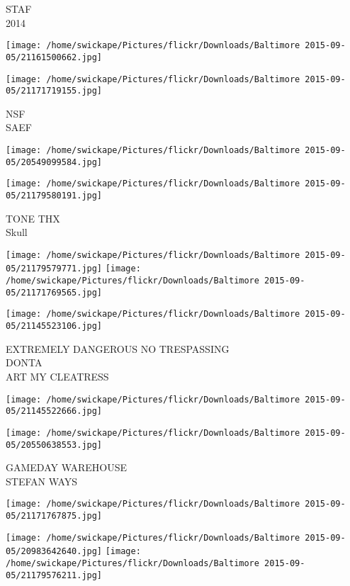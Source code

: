 \documentclass[10pt,letterpaper]{article}
\begin{document}
STAF\\
2014
\pagebreak

\texttt{[image: /home/swickape/Pictures/flickr/Downloads/Baltimore 2015-09-05/21161500662.jpg]}

\vspace{0.25in}
\texttt{[image: /home/swickape/Pictures/flickr/Downloads/Baltimore 2015-09-05/21171719155.jpg]}

NSF\\
SAEF
\pagebreak

\texttt{[image: /home/swickape/Pictures/flickr/Downloads/Baltimore 2015-09-05/20549099584.jpg]}

\vspace{0.25in}
\texttt{[image: /home/swickape/Pictures/flickr/Downloads/Baltimore 2015-09-05/21179580191.jpg]}

TONE THX\\
Skull
\pagebreak

\texttt{[image: /home/swickape/Pictures/flickr/Downloads/Baltimore 2015-09-05/21179579771.jpg]}
\texttt{[image: /home/swickape/Pictures/flickr/Downloads/Baltimore 2015-09-05/21171769565.jpg]}

\vspace{0.25in}
\texttt{[image: /home/swickape/Pictures/flickr/Downloads/Baltimore 2015-09-05/21145523106.jpg]}

EXTREMELY DANGEROUS NO TRESPASSING\\
DONTA\\
ART MY CLEATRESS
\pagebreak

\texttt{[image: /home/swickape/Pictures/flickr/Downloads/Baltimore 2015-09-05/21145522666.jpg]}

\vspace{0.25in}
\texttt{[image: /home/swickape/Pictures/flickr/Downloads/Baltimore 2015-09-05/20550638553.jpg]}

GAMEDAY WAREHOUSE\\
STEFAN WAYS
\pagebreak

\texttt{[image: /home/swickape/Pictures/flickr/Downloads/Baltimore 2015-09-05/21171767875.jpg]}

\vspace{0.25in}
\texttt{[image: /home/swickape/Pictures/flickr/Downloads/Baltimore 2015-09-05/20983642640.jpg]}
\texttt{[image: /home/swickape/Pictures/flickr/Downloads/Baltimore 2015-09-05/21179576211.jpg]}
\end{document}
